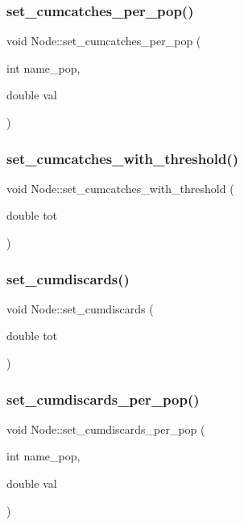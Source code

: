 \subsubsection{\texorpdfstring{set\_cumcatches\_per\_pop()}{set\_cumcatches\_per\_pop()}}
{\footnotesize\ttfamily void Node\+::set\+\_\+cumcatches\+\_\+per\+\_\+pop (\begin{DoxyParamCaption}\item[{int}]{name\+\_\+pop,  }\item[{double}]{val }\end{DoxyParamCaption})}

\mbox{\label{class_node_a7ec46867ce2300b32fe3014c03972f2c}} 
\subsubsection{\texorpdfstring{set\_cumcatches\_with\_threshold()}{set\_cumcatches\_with\_threshold()}}
{\footnotesize\ttfamily void Node\+::set\+\_\+cumcatches\+\_\+with\+\_\+threshold (\begin{DoxyParamCaption}\item[{double}]{tot }\end{DoxyParamCaption})}

\mbox{\label{class_node_a1058db59be640d33c158914115fac8f3}} 
\subsubsection{\texorpdfstring{set\_cumdiscards()}{set\_cumdiscards()}}
{\footnotesize\ttfamily void Node\+::set\+\_\+cumdiscards (\begin{DoxyParamCaption}\item[{double}]{tot }\end{DoxyParamCaption})}

\mbox{\label{class_node_acc09d3b35e8aa727151ba8fd1c92e5cb}} 
\subsubsection{\texorpdfstring{set\_cumdiscards\_per\_pop()}{set\_cumdiscards\_per\_pop()}}
{\footnotesize\ttfamily void Node\+::set\+\_\+cumdiscards\+\_\+per\+\_\+pop (\begin{DoxyParamCaption}\item[{int}]{name\+\_\+pop,  }\item[{double}]{val }\end{DoxyParamCaption})}

